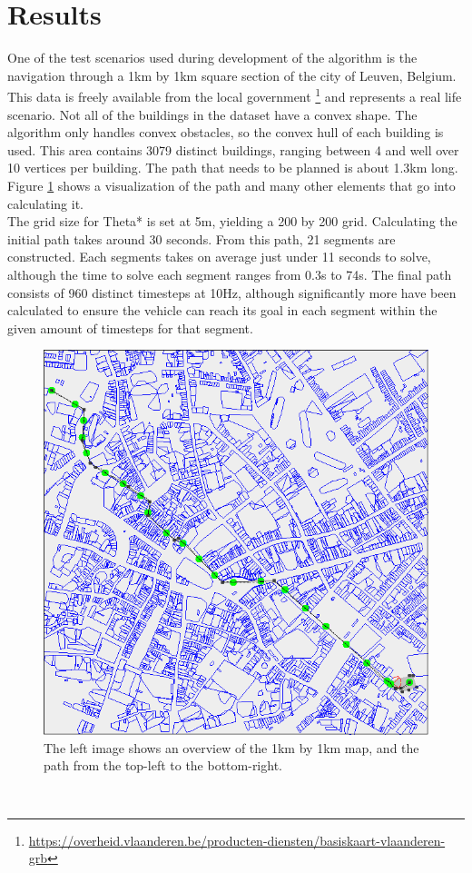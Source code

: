 \section{Results}
One of the test scenarios used during development of the algorithm is the navigation through a 1km by 1km square section of the city of Leuven, Belgium. This data is freely available from the local government \footnote{\url{https://overheid.vlaanderen.be/producten-diensten/basiskaart-vlaanderen-grb}} and represents a real life scenario. Not all of the buildings in the dataset have a convex shape. The algorithm only handles convex obstacles, so the convex hull of each building is used. This area contains 3079 distinct buildings, ranging between 4 and well over 10 vertices per building. The path that needs to be planned is about 1.3km long. Figure \ref{fig:example} shows a visualization of the path and many other elements that go into calculating it.
\\
The grid size for Theta* is set at 5m, yielding a 200 by 200 grid. Calculating the initial path takes around 30 seconds. From this path, 21 segments are constructed. Each segments takes on average just under 11 seconds to solve, although the time to solve each segment ranges from 0.3s to 74s. The final path consists of 960 distinct timesteps at 10Hz, although significantly more have been calculated to ensure the vehicle can reach its goal in each segment within the given amount of timesteps for that segment.
\begin{figure}[]
	\centering
        \includegraphics[width=0.95\columnwidth]{img/leuven}
    \caption{The left image shows an overview of the 1km by 1km map, and the path from the top-left to the bottom-right.}\label{fig:example}
\end{figure}
\\


